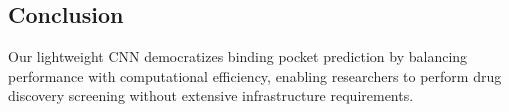 \documentclass[11pt,a4paper]{article}
\begin{document}
\begin{multicols}{2}
\section{Conclusion}

Our lightweight CNN democratizes binding pocket prediction by balancing performance with computational efficiency, enabling researchers to perform drug discovery screening without extensive infrastructure requirements.

\end{multicols}

\vfill
\end{document}
